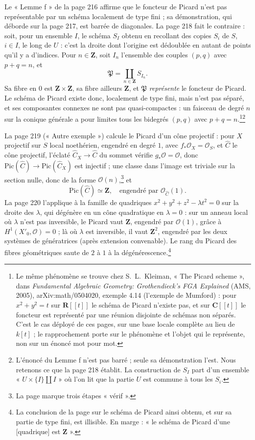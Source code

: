 \documentclass[11pt,a4paper]{article}
\begin{document}
Le « Lemme f » de la page 216 affirme que le foncteur de Picard n'est pas
représentable par un schéma localement de type fini ; sa démonstration, qui
déborde sur la page 217, est barrée de diagonales. La page 218 fait le
contraire : soit, pour un ensemble $I$, le schéma $S_I$ obtenu en recollant
des copies $S_i$ de $S$, $i \in I$, le long de $U$ : c'est la droite dont l'origine
est dédoublée en autant de points qu'il y a d'indices. Pour $n \in \mathbf{Z}$,
soit $I_n$ l'ensemble des couples $(p, q)$ avec $p + q = n$, et
\[
\mathfrak{P} = \coprod_{n \in \mathbf{Z}} S_{I_n} .
\]
Sa fibre en $0$ est $\mathbf{Z} \times \mathbf{Z}$, sa fibre ailleurs
$\mathbf{Z}$, et $\mathfrak{P}$ \emph{représente} le foncteur de Picard. Le
schéma de Picard existe donc, localement de type fini, mais n'est pas séparé,
et ses composantes connexes ne sont pas quasi-compactes : un faisceau de degré
$n$ sur la conique générale a pour limites tous les bidegrés $(p, q)$ avec
$p + q = n$.\footnote{Le même phénomène se trouve chez S.~L.~Kleiman, « The
Picard scheme », dans \emph{Fundamental Algebraic Geometry: Grothendieck's FGA
Explained} (AMS, 2005), arXiv:math/0504020, exemple 4.14 (l'exemple de
Mumford) : pour $x^2 + y^2 = t$ sur $\mathbf{R}[[t]]$ le schéma de Picard
n'existe pas, et sur $\mathbf{C}[[t]]$ le foncteur est représenté par une
réunion disjointe de schémas non séparés. C'est le cas déployé de ces pages,
sur une base locale complète au lieu de $k[t]$ ; le rapprochement porte sur le
phénomène et l'objet qui le représente, non sur un énoncé mot pour mot.}\footnote{L'énoncé du Lemme f n'est pas barré ; seule sa
démonstration l'est. Nous retenons ce que la page 218 établit. La construction
de $S_I$ part d'un ensemble « $U \times \{I\} \amalg I$ » où l'on lit que la
partie $U$ est commune à tous les $S_i$.}

La page 219 (« Autre exemple ») calcule le Picard d'un cône projectif : pour
$X$ projectif sur $S$ local noethérien, engendré en degré $1$, avec
$f_*\mathcal{O}_X = \mathcal{O}_S$, et $\hat{C}$ le cône projectif, l'éclaté
$\hat{C}_X \to \hat{C}$ du sommet vérifie $g_*\mathcal{O} = \mathcal{O}$, donc
$\mathrm{Pic}(\hat{C}) \to \mathrm{Pic}(\hat{C}_X)$ est injectif ; une classe
dans l'image est triviale sur la section nulle, donc de la forme
$\mathcal{O}(n)$,\footnote{La page marque trois étapes « vérif ».} et
\[
\mathrm{Pic}(\hat{C}) \simeq \mathbf{Z}, \quad \text{engendré par } \mathcal{O}_{\hat{C}}(1) .
\]
La page 220 l'applique à la famille de quadriques
$x^2 + y^2 + z^2 - \lambda t^2 = 0$ sur la droite des $\lambda$, qui dégénère en
un cône quadratique en $\lambda = 0$ : sur un anneau local où $\lambda$ n'est
pas inversible, le Picard vaut $\mathbf{Z}$, engendré par $\mathcal{O}(1)$,
grâce à $H^1(X'_0, \mathcal{O}) = 0$ ; là où $\lambda$ est inversible, il vaut
$\mathbf{Z}^2$, engendré par les deux systèmes de génératrices (après
extension convenable). Le rang du Picard des fibres géométriques saute de $2$
à $1$ à la dégénérescence.\footnote{La conclusion de la page sur le schéma de
Picard ainsi obtenu, et sur sa partie de type fini, est illisible. En
marge : « le schéma de Picard d'une [quadrique] est $\mathbf{Z}$ ».}
\end{document}
